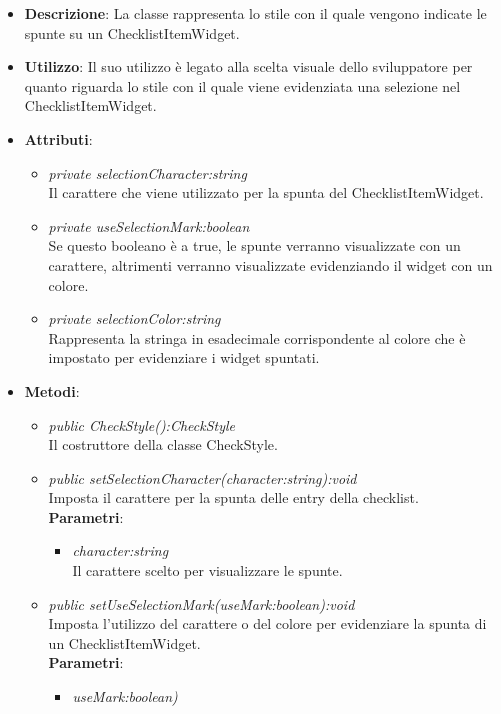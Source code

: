 \begin{itemize}
\item \textbf{Descrizione}: La classe rappresenta lo stile con il quale vengono indicate le spunte su un ChecklistItemWidget.
\item \textbf{Utilizzo}: Il suo utilizzo è legato alla scelta visuale dello sviluppatore per quanto riguarda lo stile con il quale viene evidenziata una selezione nel ChecklistItemWidget.
\item \textbf{Attributi}:
	\begin{itemize}
	\item \textit{private selectionCharacter:string}\\
	Il carattere che viene utilizzato per la spunta del ChecklistItemWidget.
	\item \textit{private useSelectionMark:boolean}\\
	Se questo booleano è a true, le spunte verranno visualizzate con un carattere, altrimenti verranno visualizzate evidenziando il widget con un colore.
	\item \textit{private selectionColor:string}\\
	Rappresenta la stringa in esadecimale corrispondente al colore che è impostato per evidenziare i widget spuntati.
	\end{itemize}
\item \textbf{Metodi}:
	\begin{itemize}
	\item \textit{public CheckStyle():CheckStyle}\\
	Il costruttore della classe CheckStyle.
	\item \textit{public setSelectionCharacter(character:string):void}\\
	Imposta il carattere per la spunta delle entry della checklist.
		\\ \textbf{Parametri}: \begin{itemize}
		\item \textit{character:string}\\
		Il carattere scelto per visualizzare le spunte.
		\end{itemize} 
	\item \textit{public setUseSelectionMark(useMark:boolean):void}\\
	Imposta l'utilizzo del carattere o del colore per evidenziare la spunta di un ChecklistItemWidget.
		\\ \textbf{Parametri}: \begin{itemize}
		\item \textit{useMark:boolean)}\\

\end{itemize}
\end{itemize}
\end{itemize}
